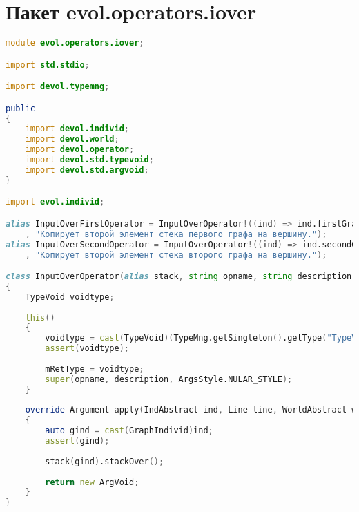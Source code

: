 \documentclass[russian,utf8,emptystyle]{eskdtext}
\begin{document}
\section{Пакет evol.operators.iover}
\begin{lstlisting}[language=D]
module evol.operators.iover;

import std.stdio;

import devol.typemng;

public
{
    import devol.individ;
    import devol.world;
    import devol.operator;
    import devol.std.typevoid;
    import devol.std.argvoid;
}

import evol.individ;

alias InputOverFirstOperator = InputOverOperator!((ind) => ind.firstGraphStack, "iover1"
    , "Копирует второй элемент стека первого графа на вершину.");  
alias InputOverSecondOperator = InputOverOperator!((ind) => ind.secondGraphStack, "iover2"
    , "Копирует второй элемент стека второго графа на вершину.");

class InputOverOperator(alias stack, string opname, string description) : Operator
{
    TypeVoid voidtype;
    
    this()
    {
        voidtype = cast(TypeVoid)(TypeMng.getSingleton().getType("TypeVoid"));
        assert(voidtype);
        
        mRetType = voidtype;
        super(opname, description, ArgsStyle.NULAR_STYLE);
    }
    
    override Argument apply(IndAbstract ind, Line line, WorldAbstract world)
    {
        auto gind = cast(GraphIndivid)ind;
        assert(gind);
        
        stack(gind).stackOver();
        
        return new ArgVoid;
    }   
}
\end{lstlisting}
\end{document}
